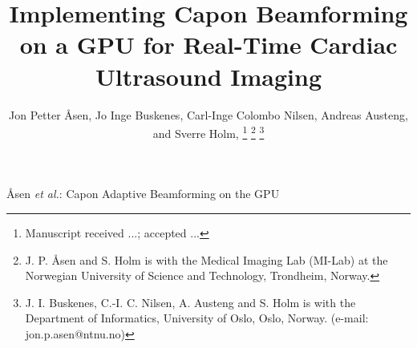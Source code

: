 \documentclass[journal]{IEEEtran}
\begin{document}
%
\title{Implementing Capon Beamforming on a GPU for Real-Time Cardiac Ultrasound Imaging}
%
%
%

\author{Jon Petter \AA{}sen,  Jo Inge Buskenes, Carl-Inge Colombo Nilsen,  Andreas Austeng,  and Sverre Holm,  %
\thanks{Manuscript received ...; accepted ...}
\thanks{J. P. \AA{}sen and S. Holm is with the Medical Imaging Lab (MI-Lab) at the Norwegian University of Science and Technology, Trondheim, Norway.}
\thanks{J. I. Buskenes, C.-I. C. Nilsen, A. Austeng and S. Holm is with the Department of Informatics, University of Oslo, Oslo, Norway. (e-mail: jon.p.asen@ntnu.no)} 
}


% 
%



%
{\AA{}sen \MakeLowercase{\textit{et al.}}: Capon Adaptive Beamforming on the GPU}
% 
\end{document}
